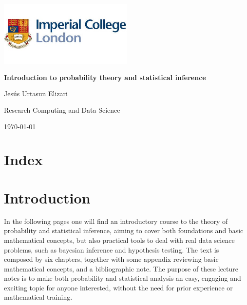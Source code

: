 \documentclass{book}
\begin{document}

\frontmatter

\begin{titlepage}
    \centering
    \includegraphics[width=0.5\textwidth]{figures/icl_logo.jpeg} 
    \vfill
    {\Huge\bfseries Introduction to probability theory and statistical inference\par}
    \vspace{1cm}
    {\Large Jes\'us Urtasun Elizari\par}
    \vspace{1cm}
     {\Large Research Computing and Data Science\par}
    \vspace{1cm}
    {\large\today\par}
    \vspace*{\fill}
\end{titlepage}

\tableofcontents

\chapter*{Index}
\clearpage
\printindex

\mainmatter


\chapter{Introduction}

\indent In the following pages one will find an introductory course to the theory of probability and statistical inference, aiming to cover both foundations and basic mathematical concepts, but also practical tools to deal with real data science problems, such as bayesian inference and hypothesis testing. The text is composed by six chapters, together with some appendix reviewing basic mathematical concepts, and a bibliographic note. The purpose of these lecture notes is to make both probability and statistical analysis an easy, engaging and exciting topic for anyone interested, without the need for prior experience or mathematical training.\\
\end{document}
